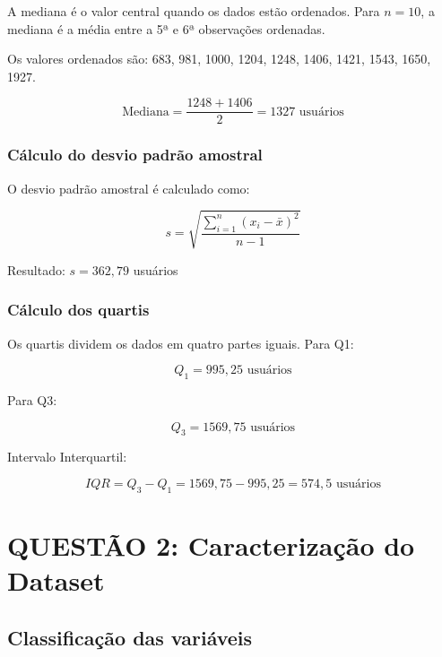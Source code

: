 \documentclass[12pt,a4paper]{article}
\begin{document}
A mediana é o valor central quando os dados estão ordenados. Para $n = 10$, a mediana é a média entre a 5ª e 6ª observações ordenadas.

Os valores ordenados são: 683, 981, 1000, 1204, 1248, 1406, 1421, 1543, 1650, 1927.

\begin{equation}
\text{Mediana} = \frac{1248 + 1406}{2} = 1327 \text{ usuários}
\end{equation}

\subsubsection{Cálculo do desvio padrão amostral}

O desvio padrão amostral é calculado como:

\begin{equation}
s = \sqrt{\frac{\sum_{i=1}^{n}(x_i - \bar{x})^2}{n-1}}
\end{equation}

Resultado: $s = 362,79$ usuários

\subsubsection{Cálculo dos quartis}

Os quartis dividem os dados em quatro partes iguais. Para Q1:

\begin{equation}
Q_1 = 995,25 \text{ usuários}
\end{equation}

Para Q3:

\begin{equation}
Q_3 = 1569,75 \text{ usuários}
\end{equation}

Intervalo Interquartil:

\begin{equation}
IQR = Q_3 - Q_1 = 1569,75 - 995,25 = 574,5 \text{ usuários}
\end{equation}

\section{QUESTÃO 2: Caracterização do Dataset}\label{sec:questao2}

\subsection{Classificação das variáveis}
\end{document}

